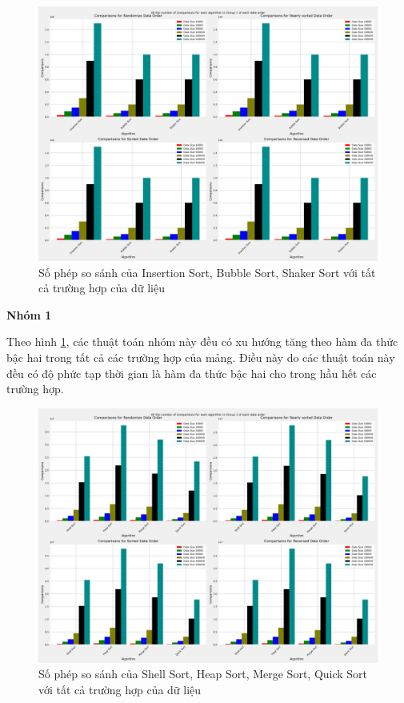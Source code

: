 \begin{figure}[H]
    \centering
    \includegraphics[width=\textwidth]{experimental_result/images/all_the_number_of_comparisons_for_each_algorithm_in_group_1_of_each_data_order.png}
    \caption{Số phép so sánh của Insertion Sort, Bubble Sort, Shaker Sort với tất cả trường hợp của dữ liệu}
    \label{fig:all_the_number_of_comparisons_for_each_algorithm_in_group_1_of_each_data_order}
\end{figure}

\textbf{Nhóm 1}

Theo hình \ref{fig:all_the_number_of_comparisons_for_each_algorithm_in_group_1_of_each_data_order}, các thuật toán nhóm này đều có xu hướng tăng theo hàm đa thức bậc hai trong tất cả các trường hợp của mảng. Điều này do các thuật toán này đều có độ phức tạp thời gian là hàm đa thức bậc hai cho trong hầu hết các trường hợp. 



\begin{figure}[H]
    \centering
    \includegraphics[width=\textwidth]{experimental_result/images/all_the_number_of_comparisons_for_each_algorithm_in_group_2_of_each_data_order.png}
    \caption{Số phép so sánh của Shell Sort, Heap Sort, Merge Sort, Quick Sort với tất cả trường hợp của dữ liệu}
    \label{fig:all_the_number_of_comparisons_for_each_algorithm_in_group_2_of_each_data_order}
\end{figure}

